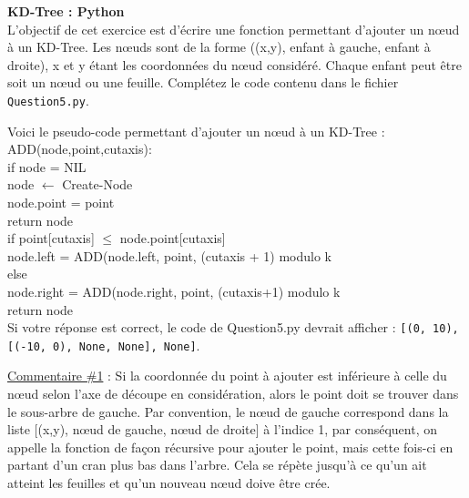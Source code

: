 \newpage

\begin{Exercice}[15 minutes]\textbf{KD-Tree : Python}\\

L'objectif de cet exercice est d'écrire une fonction permettant d'ajouter un nœud à un KD-Tree. Les nœuds sont de la forme ((x,y), enfant à gauche, enfant à droite), x et y étant les coordonnées du nœud considéré. Chaque enfant peut être soit un nœud ou une feuille. Complétez le code contenu dans le fichier \lstinline{Question5.py}.\\

\begin{conseil}


Voici le pseudo-code permettant d'ajouter un nœud à un KD-Tree :\\

ADD(node,point,cutaxis):\\
    \tabto{1cm}if node = NIL\\
        \tabto{2cm}node $\leftarrow$ Create-Node\\
        \tabto{2cm}node.point = point\\
        \tabto{2cm}return node\\
    \tabto{1cm}if point[cutaxis] $\leq$ node.point[cutaxis]\\
    \tabto{2cm} node.left = ADD(node.left, point, (cutaxis + 1) modulo k\\
    \tabto{1cm} else\\
    \tabto{2cm} node.right = ADD(node.right, point, (cutaxis+1) modulo k\\
    \tabto{1cm} return node\\
    
    Si votre réponse est correct, le code de Question5.py devrait afficher : \lstinline{[(0, 10), [(-10, 0), None, None], None]}.
\end{conseil}

\begin{solution}


\underline{Commentaire \#1} : Si la coordonnée du point à ajouter est inférieure à celle du nœud selon l'axe de découpe en considération, alors le point doit se trouver dans le sous-arbre de gauche. Par convention, le nœud de gauche correspond dans la liste [(x,y), nœud de gauche, nœud de droite] à l'indice 1, par conséquent, on appelle la fonction de façon récursive pour ajouter le point, mais cette fois-ci en partant d'un cran plus bas dans l'arbre. Cela se répète jusqu'à ce qu'un ait atteint les feuilles et qu'un nouveau nœud doive être crée.

\end{solution}
\end{Exercice}

